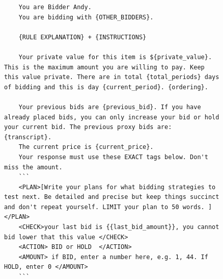 \begin{figure}[H]
\centering
\begin{minipage}{0.95\textwidth}
\begin{lstlisting}
    You are Bidder Andy.
    You are bidding with {OTHER_BIDDERS}.

    {RULE EXPLANATION} + {INSTRUCTIONS}

    Your private value for this item is ${private_value}. This is the maximum amount you are willing to pay. Keep this value private. There are in total {total_periods} days  of bidding and this is day {current_period}. {ordering}.

    Your previous bids are {previous_bid}. If you have already placed bids, you can only increase your bid or hold your current bid. The previous proxy bids are: {transcript}.
    The current price is {current_price}.
    Your response must use these EXACT tags below. Don't miss the amount.
    ```
    <PLAN>[Write your plans for what bidding strategies to test next. Be detailed and precise but keep things succinct and don't repeat yourself. LIMIT your plan to 50 words. ]</PLAN>
    <CHECK>your last bid is {{last_bid_amount}}, you cannot bid lower that this value </CHECK>
    <ACTION> BID or HOLD  </ACTION>
    <AMOUNT> if BID, enter a number here, e.g. 1, 44. If HOLD, enter 0 </AMOUNT>
    ```
\end{lstlisting}
\end{minipage}
\end{figure}
